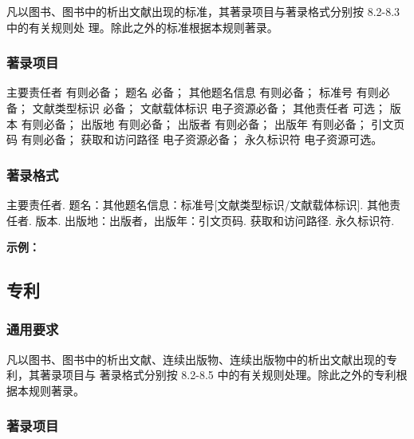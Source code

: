 \documentclass{article}
\begin{document}
凡以图书、图书中的析出文献出现的标准，其著录项目与著录格式分别按 8.2-8.3 中的有关规则处
理。除此之外的标准根据本规则著录。

\subsubsection{著录项目}

主要责任者 有则必备；
题名 必备；
其他题名信息 有则必备；
标准号 有则必备；
文献类型标识 必备；
文献载体标识 电子资源必备；
其他责任者 可选；
版本 有则必备；
出版地 有则必备；
出版者 有则必备；
出版年 有则必备；
引文页码 有则必备；
获取和访问路径 电子资源必备；
永久标识符 电子资源可选。

\subsubsection{著录格式}
主要责任者. 题名：其他题名信息：标准号[文献类型标识/文献载体标识]. 其他责任者. 版本.
出版地：出版者，出版年：引文页码. 获取和访问路径. 永久标识符.

\begin{refsection}

\nocite{全国信息文献标准化技术委员会2010-3-3}
\nocite{全国广播电视标准化技术委员会2007-1-1}
\nocite{水电水利2020,国家环境保护局科技标准司1996-2-3,
中国铁建2021,华北水利2022,网络安全2021,国家标准局信息分类编码研究所1988-59-92}
\nocite{Auditdata2019,Softwareinterface2021,
Informationtechnology2020,Lithiumbattery2022,
Explosiveatmospheres2016,Atmospheresexplosives2016}


\textbf{示例：}

{\printbibliography[heading=none,env=indentegenv]}
\end{refsection}


\subsection{专利}

\subsubsection{通用要求}

凡以图书、图书中的析出文献、连续出版物、连续出版物中的析出文献出现的专利，其著录项目与
著录格式分别按 8.2-8.5 中的有关规则处理。除此之外的专利根据本规则著录。

\subsubsection{著录项目}
\end{document}
